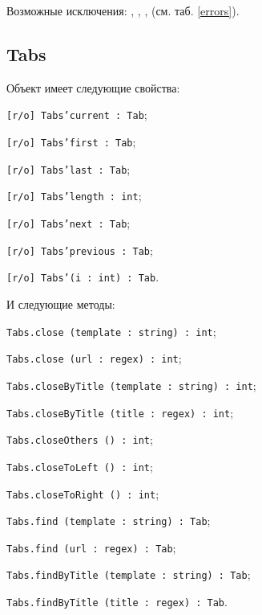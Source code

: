 Возможные исключения: , , ,  (см. таб. \ref{errors}).


\subsection{{\color{orange} Tabs}}

Объект \tabs{} имеет следующие свойства:
\begin{icItems}
	\item \texttt{[r/o] Tabs'current : Tab};
	\item \texttt{[r/o] Tabs'first : Tab};
	\item \texttt{[r/o] Tabs'last : Tab};
	\item \texttt{[r/o] Tabs'length : int};
	\item \texttt{[r/o] Tabs'next : Tab};
	\item \texttt{[r/o] Tabs'previous : Tab};
	\item \texttt{[r/o] Tabs'(i : int) : Tab}.
\end{icItems}

И следующие методы:
\begin{icItems}
	\item \texttt{Tabs.close (template : string) : int};
	\item \texttt{Tabs.close (url : regex) : int};
	\item \texttt{Tabs.closeByTitle (template : string) : int};
	\item \texttt{Tabs.closeByTitle (title : regex) : int};
	\item \texttt{Tabs.closeOthers () : int};
	\item \texttt{Tabs.closeToLeft () : int};
	\item \texttt{Tabs.closeToRight () : int};
	\item \texttt{Tabs.find (template : string) : Tab};
	\item \texttt{Tabs.find (url : regex) : Tab};
	\item \texttt{Tabs.findByTitle (template : string) : Tab};
	\item \texttt{Tabs.findByTitle (title : regex) : Tab}.
\end{icItems}

